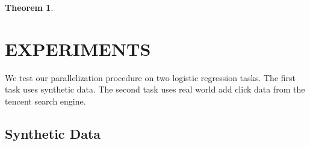 \documentclass[twoside]{article}
\newtheorem{theorem}{Theorem}
\newtheorem{lemma}{Lemma}
\newcommand{\Wave}{{\mathcal{\hat W}^{ave}}}
\newcommand{\w}{\theta}
\newcommand{\wmle}{\hat\w^{mle}}
\newcommand{\wstar}{{\w^{*}}}
\newcommand{\ltwo}[1]{{\left\lVert {#1} \right\rVert}}
\newcommand{\proj}[1]{\pi_{{#1}}}
\newcommand{\ignore}[1]{}
\begin{document}
{\begin{theorem}

\end{theorem}

\ignore{
\subsection{Overall growth}

In this section we assume the following regularity conditions.

\begin{theorem}
Assume conditions (1-5) above hold.
Then in the limit as $n$ approaches $\infty$:
\begin{enumerate}
\item
If $f$ is locally $\sigma$-strongly convex around $\wstar$
\begin{equation}
\Pr{a}
\end{equation}
\item
If $f$ is locally $\ell$-Lipschitz around $\wstar$
(i.e. ),
then
\begin{equation}
\end{equation}
\end{enumerate}
\end{theorem}

\begin{lemma}
\label{lem:normaff}
Let $W : \mathbb{R}^{d\times m}$ be a random matrix where each entry is distributed as a standard Gaussian.
Let $\Wave$ be the affine hull of the columns of $W$;
that is,
\begin{equation}
\Wave = \left\{\sum_{i=1}^m c_i\wmle_i : c\in\mathbb{R}, \sum_{i=1}^m c_i = 1 \right\}
\end{equation}
Then for all $t$,
\begin{equation}
\Pr\left[\ltwo{\proj{W}0}^2 > O(t(1-m/d))\right] \le 1 - \exp(-t)
\end{equation}
\end{lemma}
}
}

\section{EXPERIMENTS}
\label{sec:exp}

We test our parallelization procedure on two logistic regression tasks.
The first task uses synthetic data.
The second task uses real world add click data from the tencent search engine.

\subsection{Synthetic Data}
\end{document}
